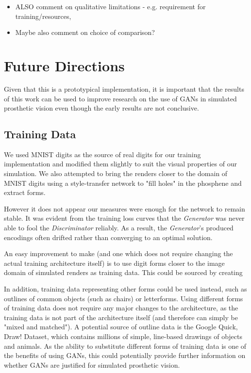 \documentclass[a4paper,11pt,openany]{book}
\begin{document}
\begin{itemize}
\item ALSO comment on qualitative limitations - e.g. requirement for training/resources,
\item Maybe also comment on choice of comparison?
\end{itemize}

\chapter{Future Directions}
\label{sec:org534d2c4}

Given that this is a prototypical implementation, it is important that the results of this work can be used to improve research on the use of GANs in simulated prosthetic vision even though the early results are not conclusive.

\section*{Training Data}
\label{sec:org02b7c7c}

We used MNIST digits as the source of real digits for our training implementation and modified them slightly to suit the visual properties of our simulation.
We also attempted to bring the renders closer to the domain of MNIST digits using a style-transfer network to "fill holes" in the phosphene and extract forms.

However it does not appear our measures were enough for the network to remain stable.
It was evident from the training loss curves that the \emph{Generator} was never able to fool the \emph{Discriminator} reliably.
As a result, the \emph{Generator}'s produced encodings often drifted rather than converging to an optimal solution.

An easy improvement to make (and one which does not require changing the actual training architecture itself) is to use digit forms closer to the image domain of simulated renders as training data.
This could be sourced by creating

In addition, training data representing other forms could be used instead, such as outlines of common objects (such as chairs) or letterforms.
Using different forms of training data does not require any major changes to the architecture, as the training data is not part of the architecture itself (and therefore can simply be "mixed and matched").
A potential source of outline data is the Google Quick, Draw! Dataset, which contains millions of simple, line-based drawings of objects and animals.
As the ability to substitute different forms of training data is one of the benefits of using GANs, this could potentially provide further information on whether GANs are justified for simulated prosthetic vision.
\end{document}
